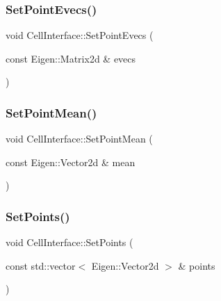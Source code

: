 \mbox{\label{classCellInterface_a34d4b95685b82f27d36479e868c35faa}} 
\subsubsection{\texorpdfstring{Set\+Point\+Evecs()}{SetPointEvecs()}}
{\footnotesize\ttfamily void Cell\+Interface\+::\+Set\+Point\+Evecs (\begin{DoxyParamCaption}\item[{const Eigen\+::\+Matrix2d \&}]{evecs }\end{DoxyParamCaption})\hspace{0.3cm}{\ttfamily [inline]}}

\mbox{\label{classCellInterface_a4d6d4a597eb09ba2098ae62f0a846e80}} 
\subsubsection{\texorpdfstring{Set\+Point\+Mean()}{SetPointMean()}}
{\footnotesize\ttfamily void Cell\+Interface\+::\+Set\+Point\+Mean (\begin{DoxyParamCaption}\item[{const Eigen\+::\+Vector2d \&}]{mean }\end{DoxyParamCaption})\hspace{0.3cm}{\ttfamily [inline]}}

\mbox{\label{classCellInterface_a6597daae0e13681de7c666828ab7a722}} 
\subsubsection{\texorpdfstring{Set\+Points()}{SetPoints()}}
{\footnotesize\ttfamily void Cell\+Interface\+::\+Set\+Points (\begin{DoxyParamCaption}\item[{const std\+::vector$<$ Eigen\+::\+Vector2d $>$ \&}]{points }\end{DoxyParamCaption})\hspace{0.3cm}{\ttfamily [inline]}}

